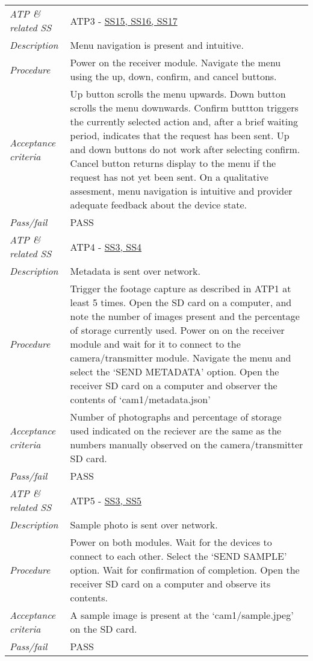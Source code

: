 \documentclass[class=report,11pt,crop=false]{standalone}
\begin{document}
\begin{table}[!ht]
\begin{scriptsize}
\begin{tabularx}{\textwidth}{|p{} X|}
        \textit{ATP \& related SS} &  ATP3 - \hyperlink{tab:firmware-requirements}{SS15, SS16, SS17}\\
        \textit{Description} & Menu navigation is present and intuitive.\\
        \textit{Procedure} & Power on the receiver module. Navigate the menu using the up, down, confirm, and cancel buttons.\\
        \textit{Acceptance criteria} & Up button scrolls the menu upwards. Down button scrolls the menu downwards. Confirm buttton triggers the currently selected action and, after a brief waiting period, indicates that the request has been sent. Up and down buttons do not work after selecting confirm. Cancel button returns display to the menu if the request has not yet been sent. On a qualitative assesment, menu navigation is intuitive and provider adequate feedback about the device state.\\ 
        \textit{Pass/fail} & PASS \\ \hline

        \textit{ATP \& related SS} & ATP4 - \hyperlink{tab:firmware-requirements}{SS3, SS4}\\
        \textit{Description} & Metadata is sent over network.\\
        \textit{Procedure} & Trigger the footage capture as described in ATP1 at least 5 times. Open the SD card on a computer, and note the number of images present and the percentage of storage currently used. Power on on the receiver module and wait for it to connect to the camera/transmitter module. Navigate the menu and select the `SEND METADATA' option. Open the receiver SD card on a computer and observer the contents of `cam1/metadata.json'\\
        \textit{Acceptance criteria} & Number of photographs and percentage of storage used indicated on the reciever are the same as the numbers manually observed on the camera/transmitter SD card. \\ 
        \textit{Pass/fail} & PASS\\ \hline

        \textit{ATP \& related SS} & ATP5 - \hyperlink{tab:firmware-requirements}{SS3, SS5} \\
        \textit{Description} & Sample photo is sent over network.\\
        \textit{Procedure} & Power on both modules. Wait for the devices to connect to each other. Select the `SEND SAMPLE' option. Wait for confirmation of completion. Open the receiver SD card on a computer and observe its contents.\\
        \textit{Acceptance criteria} & A sample image is present at the `cam1/sample.jpeg' on the SD card. \\ 
        \textit{Pass/fail} & PASS \\ \hline



\end{tabularx}
\end{scriptsize}
\end{table}
\end{document}
